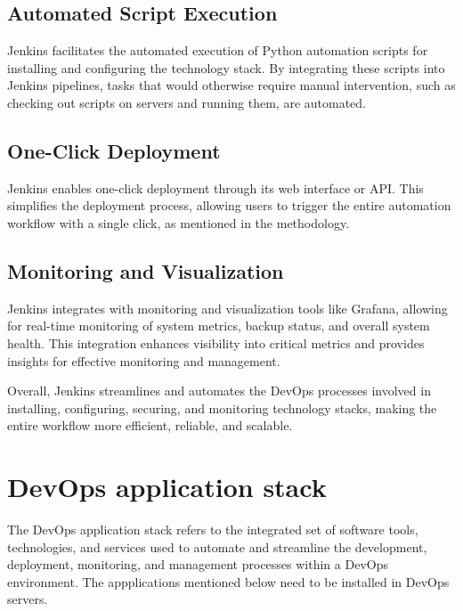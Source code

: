 \documentclass[12pt,a4paper,oneside]{report}
\begin{document}
\subsection{Automated Script Execution}
\hspace{1cm} Jenkins facilitates the automated execution of Python automation scripts for installing and configuring the technology stack. By integrating these scripts into Jenkins pipelines, tasks that would otherwise require manual intervention, such as checking out scripts on servers and running them, are automated.


\subsection{One-Click Deployment}
\hspace{1cm} Jenkins enables one-click deployment through its web interface or API. This simplifies the deployment process, allowing users to trigger the entire automation workflow with a single click, as mentioned in the methodology.

\subsection{Monitoring and Visualization}
\hspace{1cm} Jenkins integrates with monitoring and visualization tools like Grafana, allowing for real-time monitoring of system metrics, backup status, and overall system health. This integration enhances visibility into critical metrics and provides insights for effective monitoring and management.

Overall, Jenkins streamlines and automates the DevOps processes involved in installing, configuring, securing, and monitoring technology stacks, making the entire workflow more efficient, reliable, and scalable.



\section{DevOps application stack}
\par

The DevOps application stack refers to the integrated set of software tools, technologies, and services used to automate and streamline the development, deployment, monitoring, and management processes within a DevOps environment. The appplications mentioned below need to be installed in DevOps servers.
\end{document}
